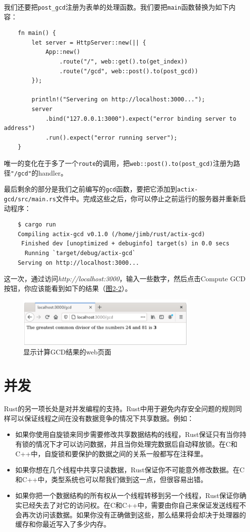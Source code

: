 我们还要把\texttt{post\_gcd}注册为表单的处理函数。我们要把\texttt{main}函数替换为如下内容：
\begin{verbatim}
    fn main() {
        let server = HttpServer::new(|| {
            App::new()
                .route("/", web::get().to(get_index))
                .route("/gcd", web::post().to(post_gcd))
        });

        println!("Servering on http://localhost:3000...");
        server
            .bind("127.0.0.1:3000").expect("error binding server to address")
            .run().expect("error running server");
    }
\end{verbatim}

唯一的变化在于多了一个\texttt{route}的调用，把\texttt{web::post().to(post\_gcd)}注册为路径\texttt{"/gcd"}的handler。

最后剩余的部分是我们之前编写的\texttt{gcd}函数，要把它添加到\texttt{actix-gcd/src/main.rs}文件中。完成这些之后，你可以停止之前运行的服务器并重新启动程序：
\begin{verbatim}
    $ cargo run
    Compiling actix-gcd v0.1.0 (/home/jimb/rust/actix-gcd)
     Finished dev [unoptimized + debuginfo] target(s) in 0.0 secs
      Running `target/debug/actix-gcd`
    Serving on http://localhost:3000...
\end{verbatim}

这一次，通过访问\emph{http://localhost:3000}，输入一些数字，然后点击Compute GCD按钮，你应该能看到如下的结果（\hyperref[f2-2]{图2-2}）。
\begin{figure}[htbp]
    \centering
    \includegraphics[width=0.8\textwidth]{../img/f2-2.png}
    \caption{显示计算GCD结果的web页面}
    \label{f2-2}
\end{figure}

\section{并发}
Rust的另一项长处是对并发编程的支持。Rust中用于避免内存安全问题的规则同样可以保证线程之间在没有数据竞争的情况下共享数据。例如：
\begin{itemize}
    \item 如果你使用自旋锁来同步需要修改共享数据结构的线程，Rust保证只有当你持有锁的情况下才可以访问数据，并且当你处理完数据后自动释放锁。在C和C++中，自旋锁和要保护的数据之间的关系一般都写在注释里。
    \item 如果你想在几个线程中共享只读数据，Rust保证你不可能意外修改数据。在C和C++中，类型系统也可以帮我们做到这一点，但很容易出错。
    \item 如果你把一个数据结构的所有权从一个线程转移到另一个线程，Rust保证你确实已经失去了对它的访问权。在C和C++中，需要由你自己来保证发送线程不会再次访问该数据。如果你没有正确做到这些，那么结果将会却决于处理器的缓存和你最近写入了多少内存。
\end{itemize}

